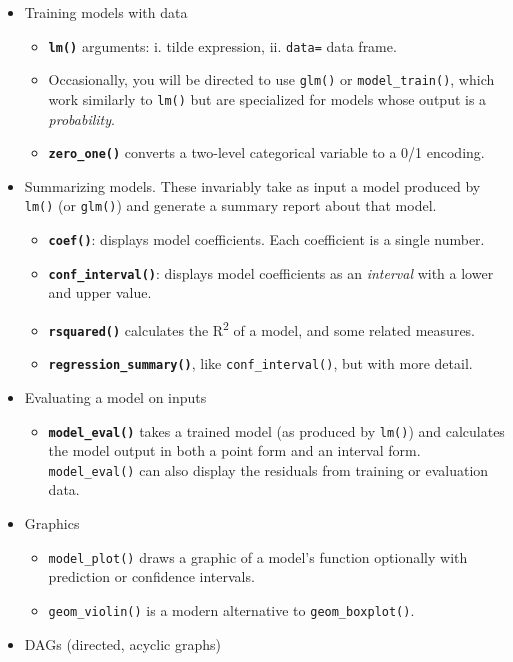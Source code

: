 \documentclass[
  letterpaper,
  DIV=11,
  numbers=noendperiod,
  oneside]{scrreprt}
\providecommand{\tightlist}{%
  \setlength{\itemsep}{0pt}\setlength{\parskip}{0pt}}\usepackage{longtable,booktabs,array}
\begin{document}
\begin{itemize}
\tightlist
\item
  Training models with data

  \begin{itemize}
  \tightlist
  \item
    \textbf{\texttt{lm()}} arguments: i. tilde expression, ii.
    \texttt{data=} data frame.
  \item
    Occasionally, you will be directed to use \texttt{glm()} or
    \texttt{model\_train()}, which work similarly to \texttt{lm()} but
    are specialized for models whose output is a \emph{probability}.
  \item
    \textbf{\texttt{zero\_one()}} converts a two-level categorical
    variable to a 0/1 encoding.
  \end{itemize}
\item
  Summarizing models. These invariably take as input a model produced by
  \texttt{lm()} (or \texttt{glm()}) and generate a summary report about
  that model.

  \begin{itemize}
  \tightlist
  \item
    \textbf{\texttt{coef()}}: displays model coefficients. Each
    coefficient is a single number.
  \item
    \textbf{\texttt{conf\_interval()}}: displays model coefficients as
    an \emph{interval} with a lower and upper value.
  \item
    \textbf{\texttt{rsquared()}} calculates the R\textsuperscript{2} of
    a model, and some related measures.
  \item
    \textbf{\texttt{regression\_summary()}}, like
    \texttt{conf\_interval()}, but with more detail.
  \end{itemize}
\item
  Evaluating a model on inputs

  \begin{itemize}
  \tightlist
  \item
    \textbf{\texttt{model\_eval()}} takes a trained model (as produced
    by \texttt{lm()}) and calculates the model output in both a point
    form and an interval form. \texttt{model\_eval()} can also display
    the residuals from training or evaluation data.
  \end{itemize}
\item
  Graphics

  \begin{itemize}
  \tightlist
  \item
    \texttt{model\_plot()} draws a graphic of a model's function
    optionally with prediction or confidence intervals.
  \item
    \texttt{geom\_violin()} is a modern alternative to
    \texttt{geom\_boxplot()}.
  \end{itemize}
\item
  DAGs (directed, acyclic graphs)


\end{itemize}
\end{document}
